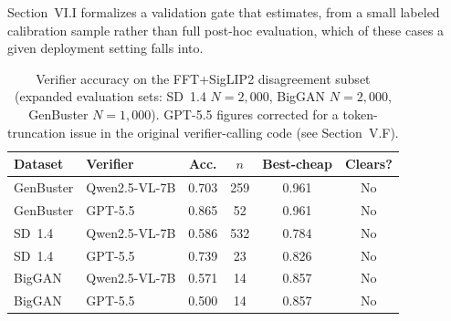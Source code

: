 

Section~VI.I formalizes a validation gate that estimates, from a small
labeled calibration sample rather than full post-hoc evaluation, which of
these cases a given deployment setting falls into.




\begin{table}[h]
\centering
\small
\setlength{\tabcolsep}{3pt}
\caption{Verifier accuracy on the FFT+SigLIP2 disagreement subset (expanded evaluation sets: SD~1.4 $N{=}2{,}000$, BigGAN $N{=}2{,}000$, GenBuster $N{=}1{,}000$). GPT-5.5 figures corrected for a token-truncation issue in the original verifier-calling code (see Section~V.F).}
\label{tab:verifier_comparison}
\begin{tabular}{llcccc}
\toprule
Dataset & Verifier & Acc. & $n$ & Best-cheap & Clears? \\
\midrule
GenBuster & Qwen2.5-VL-7B  & 0.703 & 259 & 0.961 & No \\
GenBuster & GPT-5.5        & 0.865 &  52 & 0.961 & No \\
\midrule
SD~1.4    & Qwen2.5-VL-7B  & 0.586 & 532 & 0.784 & No \\
SD~1.4    & GPT-5.5        & 0.739 &  23 & 0.826 & No \\
\midrule
BigGAN    & Qwen2.5-VL-7B  & 0.571 &  14 & 0.857 & No \\
BigGAN    & GPT-5.5        & 0.500 &  14 & 0.857 & No \\
\bottomrule
\end{tabular}
\end{table}

